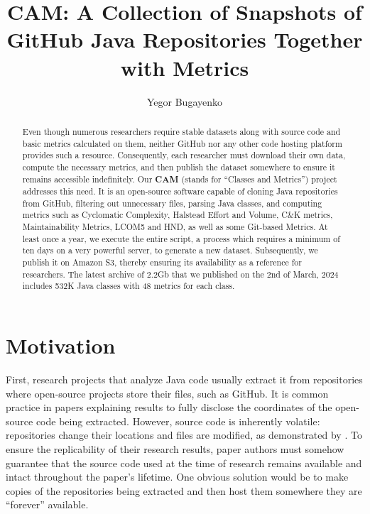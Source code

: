 \documentclass[sigplan,nonacm,review,anonymous]{acmart}
\title{CAM: A Collection of Snapshots of GitHub Java Repositories Together with Metrics}
\author{Yegor Bugayenko}
\affiliation{\institution{Huawei, Russia, Moscow}\city{}\country{}}
\newcommand\cam{{\sffamily\bfseries CAM}}
\begin{document}

\begin{abstract}
Even though numerous researchers require stable datasets along with source code
and basic metrics calculated on them, neither GitHub nor any other code hosting
platform provides such a resource. Consequently, each researcher must download
their own data, compute the necessary metrics, and then publish the dataset
somewhere to ensure it remains accessible indefinitely. Our \cam{} (stands for
``Classes and Metrics'') project addresses this need. It is an open-source
software capable of cloning Java repositories from GitHub, filtering out
unnecessary files, parsing Java classes, and computing metrics such as
Cyclomatic Complexity, Halstead Effort and Volume, C\&K metrics,
Maintainability Metrics, LCOM5 and HND, as well as some Git-based Metrics. At
least once a year, we execute the entire script, a process which requires a
minimum of ten days on a very powerful server, to generate a new dataset.
Subsequently, we publish it on Amazon S3, thereby ensuring its availability as
a reference for researchers. The latest archive of 2.2Gb that we published on
the 2nd of March, 2024 includes 532K Java classes with 48 metrics for each
class.
\end{abstract}

\maketitle

\section{Motivation}\label{sec:motivation}

First, research projects that analyze Java code usually extract it from
repositories where open-source projects store their files, such as GitHub. It
is common practice in papers explaining results to fully disclose the
coordinates of the open-source code being extracted. However, source code is
inherently volatile: repositories change their locations and files are
modified, as demonstrated by \citet{5463348}. To ensure the replicability of
their research results, paper authors must somehow guarantee that the source
code used at the time of research remains available and intact throughout the
paper's lifetime. One obvious solution would be to make copies of the
repositories being extracted and then host them somewhere they are ``forever''
available.
\end{document}

